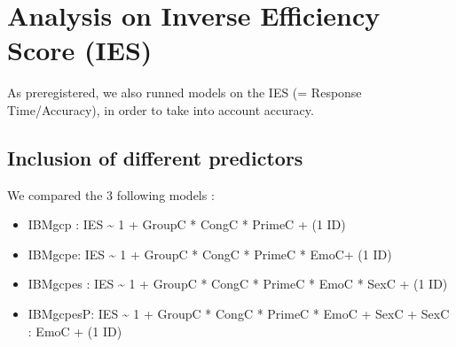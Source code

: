 \documentclass[
  11pt,
  english,
  ,doc,floatsintext]{apa6}
\begin{document}
\newpage

\hypertarget{analysis-on-inverse-efficiency-score-ies}{%
\section{Analysis on Inverse Efficiency Score (IES)}\label{analysis-on-inverse-efficiency-score-ies}}

As preregistered, we also runned models on the IES (= Response Time/Accuracy), in order to take into account accuracy.

\hypertarget{inclusion-of-different-predictors-1}{%
\subsection{Inclusion of different predictors}\label{inclusion-of-different-predictors-1}}

We compared the 3 following models :

\begin{itemize}
\item
  IBMgcp : IES \textasciitilde{} 1 + GroupC * CongC * PrimeC + (1 \textbar{} ID)
\item
  IBMgcpe: IES \textasciitilde{} 1 + GroupC * CongC * PrimeC * EmoC+ (1 \textbar{} ID)
\item
  IBMgcpes : IES \textasciitilde{} 1 + GroupC * CongC * PrimeC * EmoC * SexC + (1 \textbar{} ID)
\item
  IBMgcpesP: IES \textasciitilde{} 1 + GroupC * CongC * PrimeC * EmoC + SexC + SexC : EmoC + (1 \textbar{} ID)
\end{itemize}
\end{document}
